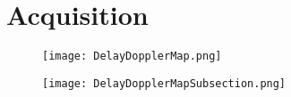 \chapter{Acquisition}


\begin{figure}[!htb] 
    \centering
    \texttt{[image: DelayDopplerMap.png]} 
    \caption{}
    \label{fig:DelayDopplerMap}
\end{figure}


\begin{figure}[!htb] 
    \centering
    \texttt{[image: DelayDopplerMapSubsection.png]} 
    \caption{}
    \label{fig:DelayDopplerMapSubsection}
\end{figure}
